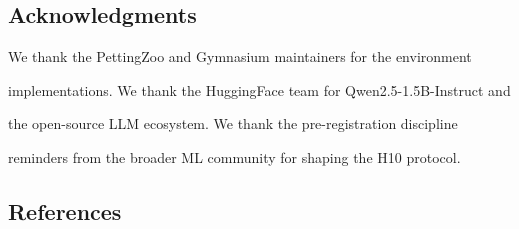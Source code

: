 \documentclass[
]{article}
\begin{document}
\subsection{Acknowledgments}\label{acknowledgments}

We thank the PettingZoo and Gymnasium maintainers for the environment

implementations. We thank the HuggingFace team for Qwen2.5-1.5B-Instruct
and

the open-source LLM ecosystem. We thank the pre-registration discipline

reminders from the broader ML community for shaping the H10 protocol.

\subsection{References}\label{references}
\end{document}
